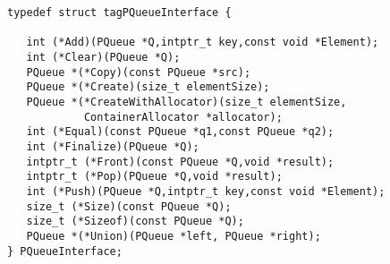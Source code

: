 \begin{verbatim}
typedef struct tagPQueueInterface {
   
   int (*Add)(PQueue *Q,intptr_t key,const void *Element);
   int (*Clear)(PQueue *Q);
   PQueue *(*Copy)(const PQueue *src);
   PQueue *(*Create)(size_t elementSize);
   PQueue *(*CreateWithAllocator)(size_t elementSize,
            ContainerAllocator *allocator);
   int (*Equal)(const PQueue *q1,const PQueue *q2);
   int (*Finalize)(PQueue *Q);
   intptr_t (*Front)(const PQueue *Q,void *result);
   intptr_t (*Pop)(PQueue *Q,void *result);
   int (*Push)(PQueue *Q,intptr_t key,const void *Element);
   size_t (*Size)(const PQueue *Q);
   size_t (*Sizeof)(const PQueue *Q);
   PQueue *(*Union)(PQueue *left, PQueue *right);
} PQueueInterface;
\end{verbatim}
